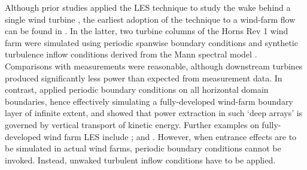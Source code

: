 Although prior studies applied the LES technique to study the wake behind a single wind turbine \citep{troldborg2007actuator, jimenez2007advances, jimenez2008large}, the earliest adoption of the technique to a wind-farm flow can be found in \cite{ivanell2009numerical}. In the latter, two turbine columns of the Horns Rev 1 wind farm were simulated using periodic spanwise boundary conditions and synthetic turbulence inflow conditions derived from the Mann spectral model \citep{mann1998wind}. Comparisons with measurements were reasonable, although downstream turbines produced significantly less power than expected from measurement data.  In contrast, \cite{calaf2010large} applied periodic boundary conditions on all horizontal domain boundaries, hence effectively simulating a fully-developed wind-farm boundary layer of infinite extent, and showed that power extraction in such `deep arrays' is governed by vertical transport of kinetic energy. Further examples on fully-developed wind farm LES include \cite{calaf2011large,yang2012computational,verhulst2014large,yang2014large,cortina2016distribution}; and \cite{sharma2017perturbations}. However, when entrance effects are to be simulated in actual wind farms, periodic boundary conditions cannot be invoked. Instead, unwaked turbulent inflow conditions have to be applied.

